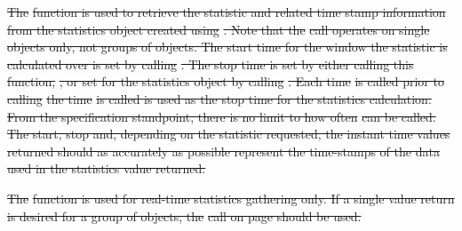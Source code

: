 \documentclass[12pt]{report} %
\providecommand{\DIFdeltex}[1]{{\protect\color{red}\sout{#1}}}                      %
\providecommand{\DIFaddend}{} %
\providecommand{\DIFdelbegin}{} %
\providecommand{\DIFdel}[1]{\texorpdfstring{\DIFdeltex{#1}}{}} %
\newcommand{\DIFscaledelfig}{0.5}
\newlength{\DIFdelgraphicswidth} %
\newlength{\DIFdelgraphicsheight} %
\newcommand{\DIFdelincludegraphics}[2][]{%
\sbox{\DIFdelgraphicsbox}{\DIFOincludegraphics[#1]{#2}}%
\settoboxwidth{\DIFdelgraphicswidth}{\DIFdelgraphicsbox} %
\settoboxtotalheight{\DIFdelgraphicsheight}{\DIFdelgraphicsbox} %
\scalebox{\DIFscaledelfig}{%
\parbox[b]{\DIFdelgraphicswidth}{\usebox{\DIFdelgraphicsbox}\\[-\baselineskip] \rule{\DIFdelgraphicswidth}{0em}}\llap{\resizebox{\DIFdelgraphicswidth}{\DIFdelgraphicsheight}{%
\setlength{\unitlength}{\DIFdelgraphicswidth}%
\begin{picture}(1,1)%
\thicklines\linethickness{2pt} %
{\color[rgb]{1,0,0}\put(0,0){\framebox(1,1){}}}%
{\color[rgb]{1,0,0}\put(0,0){\line( 1,1){1}}}%
{\color[rgb]{1,0,0}\put(0,1){\line(1,-1){1}}}%
\end{picture}%
}\hspace*{3pt}}} %
} %
\DeclareRobustCommand{\DIFaddend}{\DIFOaddend \let\includegraphics\DIFOincludegraphics} %
\DeclareRobustCommand{\DIFdelbegin}{\DIFOdelbegin \let\includegraphics\DIFdelincludegraphics} %
\begin{document}
\DIFaddend %
\DIFdelbegin %

\DIFdel{The }%
\DIFdel{function is used to retrieve the statistic and related time stamp information from the statistics object created using }%
\DIFdel{. 
Note that the }%
\DIFdel{call operates on single objects only, not groups of objects. 
The start time for the window the statistic is calculated over is set by calling }%
\DIFdel{.
The stop time is set by either calling this function, }%
\DIFdel{, or set for the statistics object by calling }%
\DIFdel{. 
Each time }%
\DIFdel{is called prior to calling }%
\DIFdel{the time }%
\DIFdel{is called is used as the stop time for the statistics calculation. 
From the specification standpoint, there is no limit to how often }%
\DIFdel{can be called. 
The start, stop and, depending on the statistic requested, the instant time values returned should as accurately as possible represent the time-stamps of the data used in the statistics value returned.
}%

\DIFdel{The }%
\DIFdel{function is used for real-time statistics gathering only.
If a single value return is desired for a group of objects, the }%
\DIFdel{call on page \pageref{func:StatGetReduce} should be used. 
}%

\end{document}
